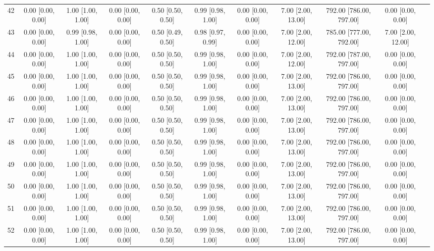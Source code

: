 \documentclass[8pt]{article}
\begin{document}
\begin{center}
\begin{footnotesize}
\begin{longtable}{|ccccccccccc|}
 42 &  0.00 [0.00, 0.00] &  1.00 [1.00, 1.00] &  0.00 [0.00, 0.00] &  0.50 [0.50, 0.50] &  0.99 [0.98, 1.00] &  0.00 [0.00, 0.00] &  7.00 [2.00, 13.00] &  792.00 [786.00, 797.00] &        0.00 [0.00, 0.00] \\
 43 &  0.00 [0.00, 0.00] &  0.99 [0.98, 1.00] &  0.00 [0.00, 0.00] &  0.50 [0.49, 0.50] &  0.98 [0.97, 0.99] &  0.00 [0.00, 0.00] &  7.00 [2.00, 12.00] &  785.00 [777.00, 792.00] &       7.00 [2.00, 12.00] \\
 44 &  0.00 [0.00, 0.00] &  1.00 [1.00, 1.00] &  0.00 [0.00, 0.00] &  0.50 [0.50, 0.50] &  0.99 [0.98, 1.00] &  0.00 [0.00, 0.00] &  7.00 [2.00, 12.00] &  792.00 [787.00, 797.00] &        0.00 [0.00, 0.00] \\
 45 &  0.00 [0.00, 0.00] &  1.00 [1.00, 1.00] &  0.00 [0.00, 0.00] &  0.50 [0.50, 0.50] &  0.99 [0.98, 1.00] &  0.00 [0.00, 0.00] &  7.00 [2.00, 13.00] &  792.00 [786.00, 797.00] &        0.00 [0.00, 0.00] \\
 46 &  0.00 [0.00, 0.00] &  1.00 [1.00, 1.00] &  0.00 [0.00, 0.00] &  0.50 [0.50, 0.50] &  0.99 [0.98, 1.00] &  0.00 [0.00, 0.00] &  7.00 [2.00, 13.00] &  792.00 [786.00, 797.00] &        0.00 [0.00, 0.00] \\
 47 &  0.00 [0.00, 0.00] &  1.00 [1.00, 1.00] &  0.00 [0.00, 0.00] &  0.50 [0.50, 0.50] &  0.99 [0.98, 1.00] &  0.00 [0.00, 0.00] &  7.00 [2.00, 13.00] &  792.00 [786.00, 797.00] &        0.00 [0.00, 0.00] \\
 48 &  0.00 [0.00, 0.00] &  1.00 [1.00, 1.00] &  0.00 [0.00, 0.00] &  0.50 [0.50, 0.50] &  0.99 [0.98, 1.00] &  0.00 [0.00, 0.00] &  7.00 [2.00, 13.00] &  792.00 [786.00, 797.00] &        0.00 [0.00, 0.00] \\
 49 &  0.00 [0.00, 0.00] &  1.00 [1.00, 1.00] &  0.00 [0.00, 0.00] &  0.50 [0.50, 0.50] &  0.99 [0.98, 1.00] &  0.00 [0.00, 0.00] &  7.00 [2.00, 13.00] &  792.00 [786.00, 797.00] &        0.00 [0.00, 0.00] \\
 50 &  0.00 [0.00, 0.00] &  1.00 [1.00, 1.00] &  0.00 [0.00, 0.00] &  0.50 [0.50, 0.50] &  0.99 [0.98, 1.00] &  0.00 [0.00, 0.00] &  7.00 [2.00, 13.00] &  792.00 [786.00, 797.00] &        0.00 [0.00, 0.00] \\
 51 &  0.00 [0.00, 0.00] &  1.00 [1.00, 1.00] &  0.00 [0.00, 0.00] &  0.50 [0.50, 0.50] &  0.99 [0.98, 1.00] &  0.00 [0.00, 0.00] &  7.00 [2.00, 13.00] &  792.00 [786.00, 797.00] &        0.00 [0.00, 0.00] \\
 52 &  0.00 [0.00, 0.00] &  1.00 [1.00, 1.00] &  0.00 [0.00, 0.00] &  0.50 [0.50, 0.50] &  0.99 [0.98, 1.00] &  0.00 [0.00, 0.00] &  7.00 [2.00, 13.00] &  792.00 [786.00, 797.00] &        0.00 [0.00, 0.00] \\

\end{longtable}
\end{footnotesize}
\end{center}
\end{document}
